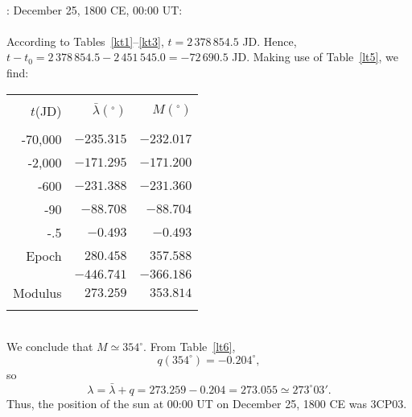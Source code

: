 ~\\
: December 25, 1800 CE, 00:00 UT:\\
~\\
According to Tables~\ref{kt1}--\ref{kt3}, $t = 2\,378\,854.5$ JD. Hence,
$ t-t_0 = 2\,378\,854.5-2\,451\,545.0=-72\,690.5$ JD. Making use of
Table~\ref{lt5}, we find:\\
\begin{tabular}{rrr}
&&\\
$t$(JD) & $\bar{\lambda}(^\circ)$ & $ M(^\circ)$\\[-2ex]
&&\\
-70,000 & $-235.315$ & $-232.017$\\
-2,000 & $-171.295$ & $-171.200$\\
-600 & $-231.388$ & $-231.360$\\
-90 & $-88.708$ & $-88.704$\\
-.5 & $-0.493$ & $-0.493$\\
Epoch & $280.458$ & $357.588$\\\cline{2-3}
&$-446.741$ & $-366.186$\\\cline{2-3}
Modulus & $273.259$ & $353.814$\\
&&\\
\end{tabular}\\
We conclude that  $M\simeq 354^\circ$. 
 From Table~\ref{lt6}, 
$$
q(354^\circ)= -0.204^\circ,
$$  
so
$$
\lambda =\bar{\lambda} + q = 273.259 - 0.204=273.055\simeq 273^\circ03'.
$$
 Thus, the position of the sun at 00:00 UT on December 25, 1800 CE was 3CP03. 

